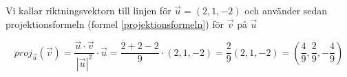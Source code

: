 \documentclass[../../main.tex]{subfiles}
\begin{document}
\begin{solution}{22}

Vi kallar riktningsvektorn till linjen för $\Vec{u}=(2, 1, -2)$ och använder sedan projektionsformeln (formel \ref{projektionsformeln}) för $\Vec{v}$ på $\Vec{u}$

$$proj_{\vec{u}}(\vec{v}) = \frac{\vec{u}\cdot\vec{v}}{|\vec{u}|^2}\cdot\vec{u} = \frac{2+2-2}{9}\cdot (2, 1, -2) = \frac{2}{9}(2, 1, -2) = (\frac{4}{9}, \frac{2}{9}, -\frac{4}{9})$$

\end{solution}
\end{document}
